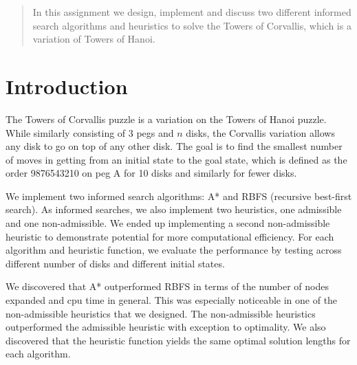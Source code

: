 \documentclass[12pt]{article}
\begin{document}
\maketitle

\begin{abstract}
In this assignment we design, implement and discuss two different informed search algorithms and heuristics to solve the Towers of Corvallis, which is a variation of Towers of Hanoi. 
\end{abstract}

\section{Introduction}

The Towers of Corvallis puzzle is a variation on the Towers of Hanoi puzzle. While similarly consisting of 3 pegs and $n$ disks, the Corvallis variation allows any disk to go on top of any other disk. The goal is to find the smallest number of moves in getting from an initial state to the goal state, which is defined as the order 9876543210 on peg A for 10 disks and similarly for fewer disks.

We implement two informed search algorithms: A* and RBFS (recursive best-first search). As informed searches, we also implement two heuristics, one admissible and one non-admissible. We ended up implementing a second non-admissible heuristic to demonstrate potential for more computational efficiency. For each algorithm and heuristic function, we evaluate the performance by testing across different number of disks and different initial states.

We discovered that A* outperformed RBFS in terms of the number of nodes expanded and cpu time in general. This was especially noticeable in one of the non-admissible heuristics that we designed. The non-admissible heuristics outperformed the admissible heuristic with exception to optimality. We also discovered that the heuristic function yields the same optimal solution lengths for each algorithm.








\end{document}
